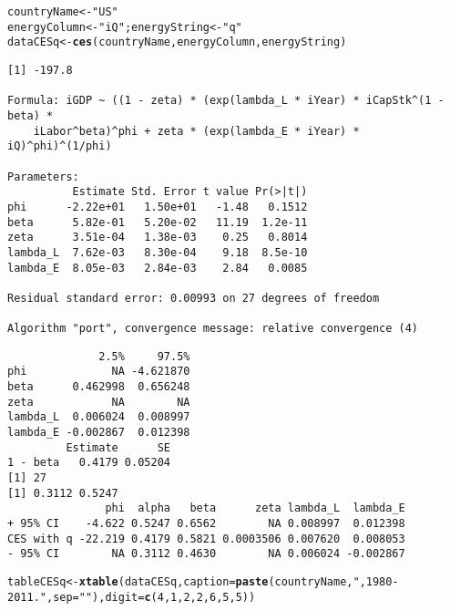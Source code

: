 \documentclass[preprint,authoryear,12pt]{elsarticle}\usepackage{graphicx, color}
\makeatletter
\newcommand{\hlfunctioncall}[1]{\textcolor[rgb]{0.501960784313725,0,0.329411764705882}{\textbf{#1}}}%
\newcommand{\hlstring}[1]{\textcolor[rgb]{0.6,0.6,1}{#1}}%
\newenvironment{kframe}{%
 \def\at@end@of@kframe{}%
 \ifinner\ifhmode%
  \def\at@end@of@kframe{\end{minipage}}%
  \begin{minipage}{\columnwidth}%
 \fi\fi%
 \def\FrameCommand##1{\hskip\@totalleftmargin \hskip-\fboxsep
 \colorbox{shadecolor}{##1}\hskip-\fboxsep
     \hskip-\linewidth \hskip-\@totalleftmargin \hskip\columnwidth}%
 \MakeFramed {\advance\hsize-\width
   \@totalleftmargin\z@ \linewidth\hsize
   \@setminipage}}%
 {\par\unskip\endMakeFramed%
 \at@end@of@kframe}
\newenvironment{knitrout}{}{} %
\makeatother
\begin{document}
\begin{knitrout}
\color{fgcolor}\begin{kframe}
\begin{alltt}
countryName <- \hlstring{"US"}
energyColumn <- \hlstring{"iQ"}; energyString <- \hlstring{"q"}
dataCESq <- \hlfunctioncall{ces}(countryName, energyColumn, energyString)
\end{alltt}
\begin{verbatim}
[1] -197.8

Formula: iGDP ~ ((1 - zeta) * (exp(lambda_L * iYear) * iCapStk^(1 - beta) * 
    iLabor^beta)^phi + zeta * (exp(lambda_E * iYear) * iQ)^phi)^(1/phi)

Parameters:
          Estimate Std. Error t value Pr(>|t|)
phi      -2.22e+01   1.50e+01   -1.48   0.1512
beta      5.82e-01   5.20e-02   11.19  1.2e-11
zeta      3.51e-04   1.38e-03    0.25   0.8014
lambda_L  7.62e-03   8.30e-04    9.18  8.5e-10
lambda_E  8.05e-03   2.84e-03    2.84   0.0085

Residual standard error: 0.00993 on 27 degrees of freedom

Algorithm "port", convergence message: relative convergence (4) 
\end{verbatim}


{\ttfamily\noindent\itshape\color{messagecolor}{Waiting for profiling to be done...}}\begin{verbatim}
              2.5%     97.5%
phi             NA -4.621870
beta      0.462998  0.656248
zeta            NA        NA
lambda_L  0.006024  0.008997
lambda_E -0.002867  0.012398
         Estimate      SE
1 - beta   0.4179 0.05204
[1] 27
[1] 0.3112 0.5247
               phi  alpha   beta      zeta lambda_L  lambda_E
+ 95% CI    -4.622 0.5247 0.6562        NA 0.008997  0.012398
CES with q -22.219 0.4179 0.5821 0.0003506 0.007620  0.008053
- 95% CI        NA 0.3112 0.4630        NA 0.006024 -0.002867
\end{verbatim}
\begin{alltt}
tableCESq <- \hlfunctioncall{xtable}(dataCESq, caption=\hlfunctioncall{paste}(countryName, \hlstring{", 1980-2011."}, sep=\hlstring{""}), digit = \hlfunctioncall{c}(4, 1, 2, 2, 6, 5, 5))
\end{alltt}
\end{kframe}
\end{knitrout}
\end{document}
